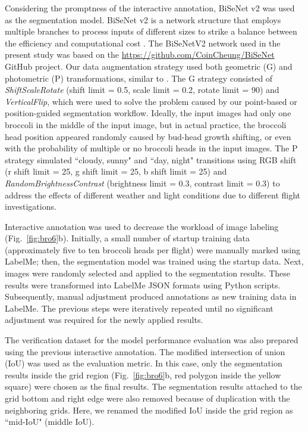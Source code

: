 Considering the promptness of the interactive annotation, BiSeNet v2 \citep{yu_bisenet_2020} was used as the segmentation model. BiSeNet v2 is a network structure that employs multiple branches to process inputs of different sizes to strike a balance between the efficiency and computational cost \citep[Fig.~1]{yu_bisenet_2020}. The BiSeNetV2 network used in the present study was based on the \url{https://github.com/CoinCheung/BiSeNet} GitHub project. Our data augmentation strategy used both geometric (G) and photometric (P) transformations, similar to \citet{blok_effect_2021}. The G strategy consisted of \textit{ShiftScaleRotate} (shift limit = 0.5, scale limit = 0.2, rotate limit = 90) and \textit{VerticalFlip}, which were used to solve the problem caused by our point-based or position-guided segmentation workflow. Ideally, the input images had only one broccoli in the middle of the input image, but in actual practice, the broccoli head position appeared randomly caused by bud-head growth shifting, or even with the probability of multiple or no broccoli heads in the input images. The P strategy simulated ``cloudy, sunny" and ``day, night" transitions using RGB shift (r shift limit = 25, g shift limit = 25, b shift limit = 25) and \textit{RandomBrightnessContrast} (brightness limit = 0.3, contrast limit = 0.3) to address the effects of different weather and light conditions due to different flight investigations.

Interactive annotation was used to decrease the workload of image labeling \linebreak (Fig.~\ref{fig:bro6}b). Initially, a small number of startup training data (approximately five to ten broccoli heads per flight) were manually marked using LabelMe; then, the segmentation model was trained using the startup data. Next, images were randomly selected and applied to the segmentation results. These results were transformed into LabelMe JSON formats using Python scripts. Subsequently, manual adjustment produced annotations as new training data in LabelMe. The previous steps were iteratively repeated until no significant adjustment was required for the newly applied results.

The verification dataset for the model performance evaluation was also prepared using the previous interactive annotation. The modified intersection of union (IoU) was used as the evaluation metric. In this case, only the segmentation results inside the grid region (Fig.~\ref{fig:bro6}b, red polygon inside the yellow square) were chosen as the final results. The segmentation results attached to the grid bottom and right edge were also removed because of duplication with the neighboring grids. Here, we renamed the modified IoU inside the grid region as ``mid-IoU" (middle IoU).

